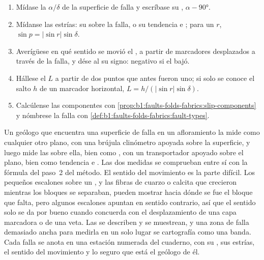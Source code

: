 \begin{method}\label{met:b1:faults-folds-fabrics:slip}
\begin{enumerate}
  \item Mídase la  $\alpha/\delta$ de la superficie de falla y escríbase su , $\alpha - \ang{90}$.
  \item Mídanse las estrías: su  sobre la falla, o su tendencia e ; para un  $r$, $\sin p = |\sin r|\sin\delta$.
  \item Averígüese en qué sentido se movió el , a partir de marcadores desplazados a través de la falla, y
        dése al  su signo: negativo si el  bajó.
  \item Hállese el  $L$ a partir de dos puntos que antes fueron uno; si solo se conoce el salto $h$ de un
        marcador horizontal, $L = h/(|\sin r|\sin\delta)$.
  \item Calcúlense las componentes con
        \cref{prop:b1:faults-folds-fabrics:slip-components} y nómbrese la falla
        con \cref{def:b1:faults-folds-fabrics:fault-types}.
\end{enumerate}
\end{method}

\begin{inthefield}
Un geólogo que encuentra una superficie de falla en un afloramiento la mide como cualquier otro plano, con una brújula
clinómetro apoyada sobre la superficie, y luego mide las  sobre ella, bien como , con un transportador
apoyado sobre el plano, bien como tendencia e . Las dos medidas se comprueban entre sí con la fórmula del paso~2 del
método. El sentido del movimiento es la parte difícil. Los pequeños escalones sobre un , y las fibras de cuarzo
o calcita que crecieron mientras los bloques se separaban, pueden mostrar hacia dónde se fue el bloque que falta, pero algunos
escalones apuntan en sentido contrario, así que el sentido solo se da por bueno cuando concuerda con el desplazamiento de una
capa marcadora o de una veta. Las  se describen y se muestrean, y una zona de falla demasiado ancha para medirla
en un solo lugar se cartografía como una banda. Cada falla se anota en una estación numerada del cuaderno, con su , sus
estrías, el sentido del movimiento y lo seguro que está el geólogo de él.
\end{inthefield}


